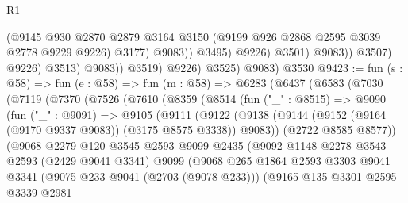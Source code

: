 \begin{lexlean}{R1}
\begin{coremodule}
                                    (@9145
                                      @930
                                      @2870
                                      @2879
                                      @3164
                                      @3150
                                      (@9199 @926 @2868 @2595 @3039 @2778 @9229 @9226)
                                      @3177)
                                    @9083))
                                @3495)
                              @9226)
                            @3501)
                          @9083))
                      @3507)
                    @9226)
                  @3513)
                @9083))
            @3519)
          @9226)
        @3525)
      @9083)
    @3530
@9423 := fun (s : @58) =>
  fun (e : @58) =>
  fun (m : @58) =>
  @6283
    (@6437
      (@6583
        (@7030
          (@7119
            (@7370
              (@7526
                (@7610
                  (@8359
                    (@8514
                      (fun ("_" : @8515) =>
                      @9090
                        (fun ("_" : @9091) =>
                        @9105
                          (@9111
                            (@9122
                              (@9138
                                (@9144
                                  (@9152 (@9164 (@9170 @9337 @9083)) (@3175 @8575 @3338))
                                  @9083))
                              (@2722 @8585 @8577))
                            (@9068
                              @2279
                              @120
                              @3545
                              @2593
                              @9099
                              @2435
                              (@9092
                                @1148
                                @2278
                                @3543
                                @2593
                                (@2429 @9041 @3341)
                                @9099
                                (@9068
                                  @265
                                  @1864
                                  @2593
                                  @3303
                                  @9041
                                  @3341
                                  (@9075 @233 @9041 (@2703 (@9078 @233)))
                                  (@9165
                                    @135
                                    @3301
                                    @2595
                                    @3339
                                    @2981

\end{coremodule}
\end{lexlean}

